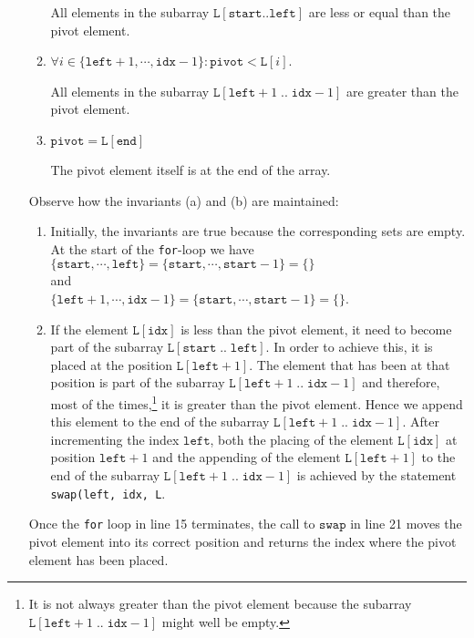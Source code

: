 \begin{enumerate}
\begin{enumerate}
            All elements in the subarray $\mathtt{L[start..left]}$ are less or equal than the pivot element.
      \item $\forall i \in \{ \mathtt{left}+1,\cdots,\mathtt{idx}-1\}:\mathtt{pivot} < \mathtt{L}[i]$.

            All elements in the subarray $\mathtt{L}[\mathtt{left}+1\;..\;\mathtt{idx}-1]$ are greater than the pivot
            element.
      \item $\mathtt{pivot} = \mathtt{L[end]}$

            The pivot element itself is at the end of the array.
      \end{enumerate}
      Observe how the invariants (a) and (b) are maintained:
      \begin{enumerate}
      \item Initially, the invariants are true because the corresponding sets are empty.
            At the start of the \texttt{for}-loop we have
            \\[0.2cm]
            \hspace*{1.3cm}
            $\{ \mathtt{start}, \cdots, \mathtt{left} \} = \{ \mathtt{start}, \cdots, \mathtt{start} - 1\} = \{\}$
            \\
            and
            \\
            \hspace*{1.3cm}
            $\{ \mathtt{left}+1,\cdots,\mathtt{idx}-1\} =  \{ \mathtt{start},\cdots,\mathtt{start}-1\}=\{\}$.
      \item If the element $\mathtt{L[idx]}$ is less than the
            pivot element, it need to become part of the subarray $\mathtt{L}[\mathtt{start}\;..\;\mathtt{left}]$.  In order to
            achieve this, it is placed at the position $\mathtt{L}[\mathtt{left}+1]$.  The element that has been at
            that position is part of the subarray $\mathtt{L}[\mathtt{left}+1\; ..\; \mathtt{idx}-1]$ and therefore, most of the times,\footnote{It is not always greater than the pivot element
      because the subarray $\mathtt{L}[\mathtt{left}+1\;..\;\mathtt{idx}-1]$ might well be empty.}
            it is greater than the pivot element.  
            Hence we append this element to the end of the subarray
            $\mathtt{L}[\mathtt{left}+1\;..\;\mathtt{idx}-1]$.  After incrementing the index $\mathtt{left}$,
            both the placing of the element $\mathtt{L[idx]}$ at position $\mathtt{left}+1$ and the appending
            of the element $\mathtt{L}[\mathtt{left}+1]$ to the end of the subarray
            $\mathtt{L}[\mathtt{left}+1\;..\;\mathtt{idx}-1]$ is achieved by the statement
            \\[0.2cm]
            \hspace*{1.3cm}
            \texttt{swap(left, idx, L}.            
      \end{enumerate}
      Once the \texttt{for} loop in line 15 terminates, the call to $\mathtt{swap}$ in line 21 moves
      the pivot element into its correct position and returns the index where the pivot element has been
      placed. 
\end{enumerate}


